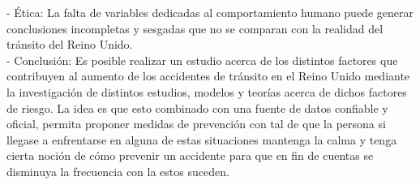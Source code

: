 \documentclass[12pt]{article}
\begin{document}
\begin{itemize}
    - Ética: La falta de variables dedicadas al comportamiento humano puede generar conclusiones incompletas y sesgadas que no se comparan con la realidad del tránsito del Reino Unido. \\ 
    
    - Conclusión: Es posible realizar un estudio acerca de los distintos factores que contribuyen al aumento de los accidentes de tránsito en el Reino Unido mediante la investigación de distintos estudios, modelos y teorías acerca de dichos factores de riesgo. La idea es que esto combinado con una fuente de datos confiable y oficial, permita proponer medidas de prevención con tal de que la persona si llegase a enfrentarse en alguna de estas situaciones mantenga la calma y tenga cierta noción de cómo prevenir un accidente para que en fin de cuentas se disminuya la frecuencia con la estos suceden.
\end{itemize}
\end{document}
